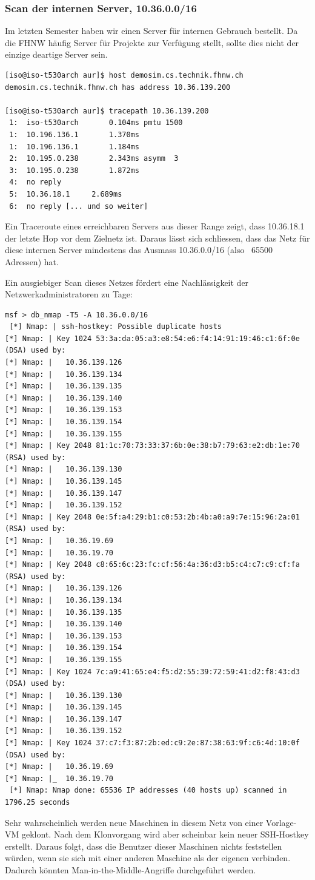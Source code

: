 \documentclass[a4paper,11pt]{scrartcl}
\begin{document}
\subsubsection{Scan der internen Server, 10.36.0.0/16}
Im letzten Semester haben wir einen Server für internen Gebrauch bestellt. Da die FHNW häufig Server für Projekte zur Verfügung stellt, sollte dies nicht der einzige deartige Server sein.
\begin{lstlisting}
[iso@iso-t530arch aur]$ host demosim.cs.technik.fhnw.ch
demosim.cs.technik.fhnw.ch has address 10.36.139.200

[iso@iso-t530arch aur]$ tracepath 10.36.139.200
 1:  iso-t530arch		0.104ms pmtu 1500
 1:  10.196.136.1		1.370ms 
 1:  10.196.136.1		1.184ms
 2:  10.195.0.238		2.343ms asymm  3 
 3:  10.195.0.238		1.872ms 
 4:  no reply
 5:  10.36.18.1		2.689ms 
 6:  no reply [... und so weiter]
\end{lstlisting}
Ein Traceroute eines erreichbaren Servers aus dieser Range zeigt, dass 10.36.18.1 der letzte Hop vor dem Zielnetz ist. Daraus lässt sich schliessen, dass das Netz für diese internen Server mindestens das Ausmass 10.36.0.0/16 (also ~65500 Adressen) hat.

Ein ausgiebiger Scan dieses Netzes fördert eine Nachlässigkeit der Netzwerkadministratoren zu Tage:
\begin{lstlisting}
msf > db_nmap -T5 -A 10.36.0.0/16
 [*] Nmap: | ssh-hostkey: Possible duplicate hosts
[*] Nmap: | Key 1024 53:3a:da:05:a3:e8:54:e6:f4:14:91:19:46:c1:6f:0e (DSA) used by:
[*] Nmap: |   10.36.139.126
[*] Nmap: |   10.36.139.134
[*] Nmap: |   10.36.139.135
[*] Nmap: |   10.36.139.140
[*] Nmap: |   10.36.139.153
[*] Nmap: |   10.36.139.154
[*] Nmap: |   10.36.139.155
[*] Nmap: | Key 2048 81:1c:70:73:33:37:6b:0e:38:b7:79:63:e2:db:1e:70 (RSA) used by:
[*] Nmap: |   10.36.139.130
[*] Nmap: |   10.36.139.145
[*] Nmap: |   10.36.139.147
[*] Nmap: |   10.36.139.152
[*] Nmap: | Key 2048 0e:5f:a4:29:b1:c0:53:2b:4b:a0:a9:7e:15:96:2a:01 (RSA) used by:
[*] Nmap: |   10.36.19.69
[*] Nmap: |   10.36.19.70
[*] Nmap: | Key 2048 c8:65:6c:23:fc:cf:56:4a:36:d3:b5:c4:c7:c9:cf:fa (RSA) used by:
[*] Nmap: |   10.36.139.126
[*] Nmap: |   10.36.139.134
[*] Nmap: |   10.36.139.135
[*] Nmap: |   10.36.139.140
[*] Nmap: |   10.36.139.153
[*] Nmap: |   10.36.139.154
[*] Nmap: |   10.36.139.155
[*] Nmap: | Key 1024 7c:a9:41:65:e4:f5:d2:55:39:72:59:41:d2:f8:43:d3 (DSA) used by:
[*] Nmap: |   10.36.139.130
[*] Nmap: |   10.36.139.145
[*] Nmap: |   10.36.139.147
[*] Nmap: |   10.36.139.152
[*] Nmap: | Key 1024 37:c7:f3:87:2b:ed:c9:2e:87:38:63:9f:c6:4d:10:0f (DSA) used by:
[*] Nmap: |   10.36.19.69
[*] Nmap: |_  10.36.19.70
 [*] Nmap: Nmap done: 65536 IP addresses (40 hosts up) scanned in 1796.25 seconds
\end{lstlisting}
Sehr wahrscheinlich werden neue Maschinen in diesem Netz von einer Vorlage-VM geklont. Nach dem Klonvorgang wird aber scheinbar kein neuer SSH-Hostkey erstellt. Daraus folgt, dass die Benutzer dieser Maschinen nichts feststellen würden, wenn sie sich mit einer anderen Maschine als der eigenen verbinden. Dadurch könnten Man-in-the-Middle-Angriffe durchgeführt werden.
\end{document}
